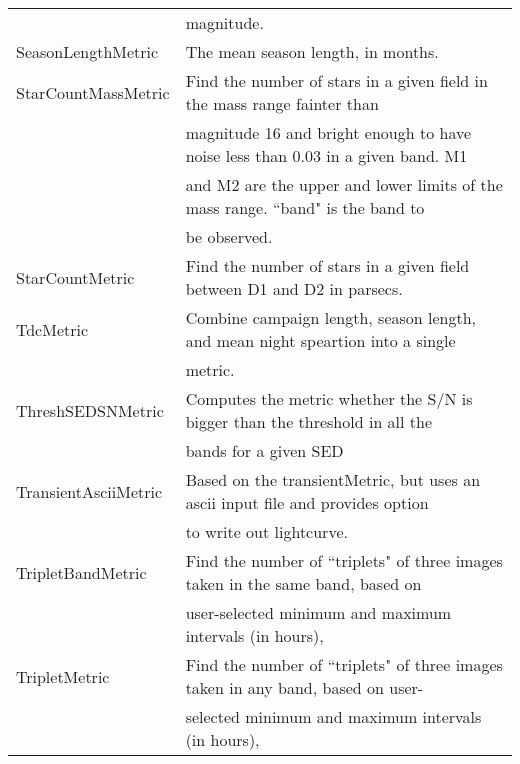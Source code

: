 \begin{table}[!t]
\begin{tabular}{ll}
  &  magnitude. \\
 SeasonLengthMetric &  The mean season length, in months. \\
 StarCountMassMetric &  Find the number of stars in a given field in the mass range fainter than \\
  &  magnitude 16 and bright enough to have noise less than 0.03 in a given band. M1 \\
  &  and M2 are the upper and lower limits of the mass range. ``band" is the band to \\
  &  be observed. \\
 StarCountMetric &  Find the number of stars in a given field between D1 and D2 in parsecs. \\
 TdcMetric &  Combine campaign length, season length, and mean night speartion into a single \\
  &  metric. \\
 ThreshSEDSNMetric &  Computes the metric whether the S/N is bigger than the threshold in all the \\
  &  bands for a given SED \\
 TransientAsciiMetric &  Based on the transientMetric, but uses an ascii input file and provides option \\
  &  to write out lightcurve. \\
 TripletBandMetric &  Find the number of ``triplets" of three images taken in the same band, based on \\
  &  user-selected minimum and maximum intervals (in hours), \\
 TripletMetric &  Find the number of ``triplets" of three images taken in any band, based on user- \\
  &  selected minimum and maximum intervals (in hours), \\
\hline
\end{tabular}
\end{table}
